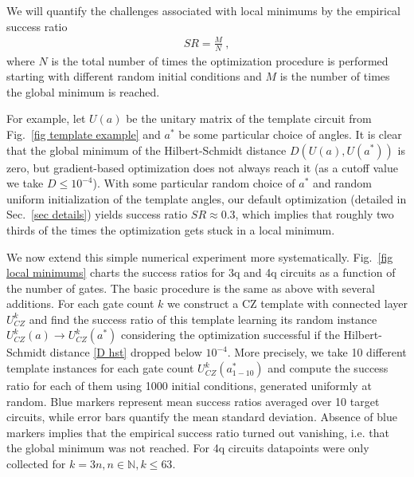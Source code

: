 \documentclass[draft, twocolumn, amsfonts, amssymb, aps, nofootinbib]{revtex4-2}
\newcommand{\CZ}{\textsf{CZ }}
\begin{document}
We will quantify the challenges associated with local minimums by the empirical success ratio
\begin{align}
	SR=\frac{M}{N} \ ,
\end{align}
where $N$ is the total number of times the optimization procedure is performed starting with different random initial conditions and $M$ is the number of times the global minimum is reached.

For example, let $U(a)$ be the unitary matrix of the template circuit from Fig.~\ref{fig template example} and $a^*$ be some particular choice of angles. It is clear that the global minimum of the Hilbert-Schmidt distance $D(U(a), U(a^*))$ is zero, but gradient-based optimization does not always reach it (as a cutoff value we take $D\le 10^{-4}$). With some particular random choice of $a^*$ and random uniform initialization of the template angles, our default optimization (detailed in Sec.~\ref{sec details}) yields success ratio $SR\approx0.3$, which implies that roughly two thirds of the times the optimization gets stuck in a local minimum.

We now extend this simple numerical experiment more systematically. Fig.~\ref{fig local minimums} charts the success ratios for 3q and 4q circuits as a function of the number of gates. The basic procedure is the same as above with several additions. For each gate count $k$ we construct a \CZ template with connected layer $U^k_{CZ}$ and find the success ratio of this template learning its random instance $U^k_{CZ}(a)\to U^k_{CZ}(a^*)$ considering the optimization successful if the Hilbert-Schmidt distance \eqref{D hst} dropped below $10^{-4}$. More precisely, we take 10 different template instances for each gate count $U^k_{CZ}(a^*_{1-10})$ and compute the success ratio for each of them using 1000 initial conditions, generated uniformly at random. Blue markers represent mean success ratios averaged over 10 target circuits, while error bars quantify the mean standard deviation. Absence of blue markers implies that the empirical success ratio turned out vanishing, i.e. that the global minimum was not reached. For 4q circuits datapoints were only collected for $k=3n, n\in\mathbb{N}, k\le 63$.
\end{document}
